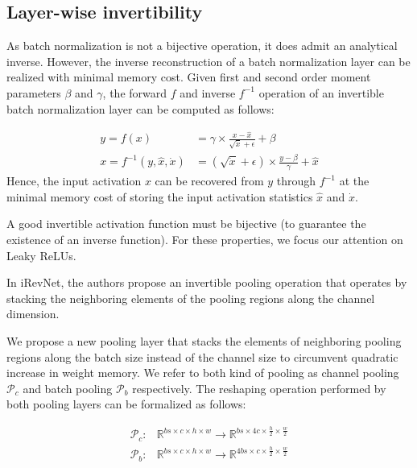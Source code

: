 \documentclass[10pt,twocolumn,letterpaper]{article}
\begin{document}
\subsection{Layer-wise invertibility}
As batch normalization is not a bijective operation, it does admit an analytical inverse. However, the inverse reconstruction of a batch normalization layer can be realized with minimal memory cost.
Given first and second order moment parameters $\beta$ and $\gamma$, the forward $f$ and inverse $f^{-1}$ operation of an invertible batch normalization layer can be computed as follows:

\begin{subequations}
\begin{align}
y = f(x) &= \gamma \times \frac{x - \hat{x}}{\sqrt{\dot{x}} + \epsilon} + \beta \\
x = f^{-1}(y, \hat{x}, \dot{x}) &= (\sqrt{\dot{x}} + \epsilon) \times \frac{y -  \beta}{\gamma}  + \hat{x}
\end{align}
\end{subequations}
Hence, the input activation $x$ can be recovered from $y$ through $f^{-1}$ at the minimal memory cost of storing the input activation statistics $\hat{x}$ and $\dot{x}$.

A good invertible activation function must be bijective (to guarantee the existence of an inverse function). For these properties, we focus our attention on Leaky ReLUs.

In iRevNet, the authors propose an invertible pooling operation that operates by stacking the neighboring elements of the pooling regions along the channel dimension. 

We propose a new pooling layer that stacks the elements of neighboring pooling regions along the batch size instead of the channel size to circumvent quadratic increase in weight memory. 
We refer to both kind of pooling as channel pooling $\mathcal{P}_c$ and batch pooling $\mathcal{P}_b$ respectively. The reshaping operation performed by both pooling layers can be formalized as follows:

\begin{subequations}
\begin{align}
	\mathcal{P}_c :&  \mathbb{R}^{bs \times c \times h \times w}  \rightarrow \mathbb{R}^{bs \times 4c \times \frac{h}{2} \times \frac{w}{2}}\\
	\mathcal{P}_b :&  \mathbb{R}^{bs \times c \times h \times w}  \rightarrow \mathbb{R}^{4bs \times c \times \frac{h}{2} \times \frac{w}{2}}
\end{align}
\end{subequations}
\end{document}

